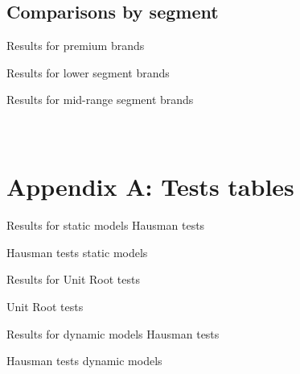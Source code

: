 \documentclass[]{article}
\begin{document}
\subsection{Comparisons by segment}
Results for premium brands



Results for lower segment brands



Results for mid-range segment brands




\appendix
\section{\\Appendix A: Tests tables}

Results for static models Hausman tests

\begin{table}[ht]
	\centering
	
	\caption{Hausman tests static models \label{tab:AppHausmanStatic}} 
	
	
\end{table}

Results for Unit Root tests
\begin{landscape}
\begin{table}[ht]
	\centering
	
	\caption{Unit Root tests \label{tab:AppUnitRoots}} 
	
	
\end{table}
\end{landscape}




Results for dynamic models Hausman tests

\begin{table}[ht]
	\centering

\caption{Hausman tests dynamic models \label{tab:AppendixHausman}} 


\end{table}
\end{document}
